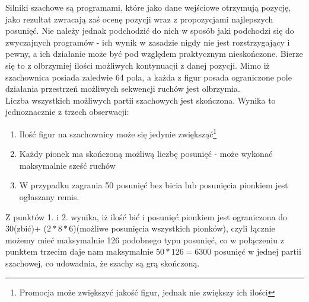 \documentclass[12pt,leqno]{article}
\begin{document}
Silniki szachowe są programami, które jako dane wejściowe otrzymują pozycję, jako rezultat zwracają zaś ocenę pozycji wraz z propozycjami najlepszych posunięć. Nie należy jednak podchodzić do nich w sposób jaki podchodzi się do zwyczajnych programów - ich wynik w zasadzie nigdy nie jest rozstrzygający i pewny, a ich działanie może być pod względem praktycznym nieskończone. Bierze się to z olbrzymiej ilości możliwych kontynuacji z danej pozycji. Mimo iż szachownica posiada zaledwie 64 pola, a każda z figur posada ograniczone pole działania przestrzeń możliwych sekwencji ruchów jest olbrzymia.\\
\indent Liczba wszystkich możliwych partii szachowych jest skończona. Wynika to jednoznacznie z trzech obserwacji: 
\begin{enumerate}
\item Ilość figur na szachownicy może się jedynie zwiększąć\footnote{Promocja może zwiększyć jakość figur, jednak nie zwiększy ich ilości}
\item Każdy pionek ma skończoną możliwą liczbę posunięć - może wykonać maksymalnie sześć ruchów
\item W przypadku zagrania 50 posunięć bez bicia lub posunięcia pionkiem jest ogłaszany remis.
\end{enumerate}
Z punktów 1. i 2. wynika, iż ilość bić i posunięć pionkiem jest ograniczona do 30(zbić)+ ($2*8*6$)(możliwe posunięcia wszystkich pionków), czyli łącznie możemy mieć maksymalnie 126 podobnego typu posunięć, co w połączeniu z punktem trzecim daje nam maksymalnie $50*126 = 6300$ posunięć w jednej partii szachowej, co udowadnia, że szachy są grą skończoną. \\
 
\end{document}
